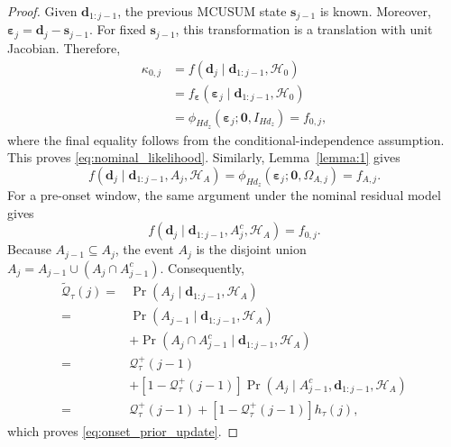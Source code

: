\documentclass[letterpaper, 10 pt, conference]{ieeeconf}
\theoremstyle{plain}
\begin{document}
\begin{proof}
    Given $\mathbf{d}_{1:j-1}$, the previous MCUSUM state $\mathbf{s}_{j-1}$ is known. Moreover, $\pmb{\varepsilon}_j = \mathbf{d}_j - \mathbf{s}_{j-1}.$ For fixed $\mathbf{s}_{j-1}$, this transformation is a translation with unit Jacobian. Therefore,
    \begin{align*}
    \kappa_{0,j} &= f\left(\mathbf{d}_j \mid \mathbf{d}_{1:j-1},\mathcal{H}_0\right)\\
    &=f_{\pmb{\varepsilon}} \left(\pmb{\varepsilon}_j \mid \mathbf{d}_{1:j-1},\mathcal{H}_0 \right)\\
    &= \phi_{Hd_z}\left(\pmb{\varepsilon}_j; \mathbf{0},I_{Hd_z}\right) = f_{0,j},
    \end{align*}
    where the final equality follows from the conditional-independence
    assumption. This proves \eqref{eq:nominal_likelihood}. Similarly,
    Lemma~\ref{lemma:1} gives
    \begin{equation}
    f\left(\mathbf{d}_j \mid \mathbf{d}_{1:j-1}, A_j,\mathcal{H}_A \right)= \phi_{Hd_z}\left(\pmb{\varepsilon}_j;
    \mathbf{0},\Omega_{A,j} \right)=f_{A,j}.
    \label{eq:active_window_likelihood}
    \end{equation}
    For a pre-onset window, the same argument under the nominal residual model gives
    \begin{equation}
    f\left(\mathbf{d}_j \mid \mathbf{d}_{1:j-1}, A_j^c,\mathcal{H}_A \right) = f_{0,j}.
    \label{eq:pre_onset_window_likelihood}
    \end{equation}
    Because $A_{j-1}\subseteq A_j$, the event $ A_j$ is the disjoint union $ A_j= A_{j-1}\cup\left( A_j\cap A_{j-1}^c\right).$ Consequently,
    \begin{align*}
    \widetilde{\mathcal{Q}}_\tau(j) =& \Pr\left(A_j \mid \mathbf{d}_{1:j-1},\mathcal{H}_A \right)\\
    =& \Pr\left(A_{j-1} \mid \mathbf{d}_{1:j-1},\mathcal{H}_A\right) \\
    &+ \Pr\left(A_j \cap A_{j-1}^{c} \mid \mathbf{d}_{1:j-1},\mathcal{H}_A\right) \\
    =& \mathcal{Q}_\tau^{+}(j-1) \\
    &+\left[1-\mathcal{Q}_\tau^{+}(j-1)\right] \Pr\left(A_j \mid A_{j-1}^{c}, \mathbf{d}_{1:j-1}, \mathcal{H}_A \right)\\
    =& \mathcal{Q}_\tau^{+}(j-1) + \left[1-\mathcal{Q}_\tau^{+}(j-1)\right] h_\tau(j),
    \end{align*}
    which proves \eqref{eq:onset_prior_update}.

\end{proof}
\end{document}
